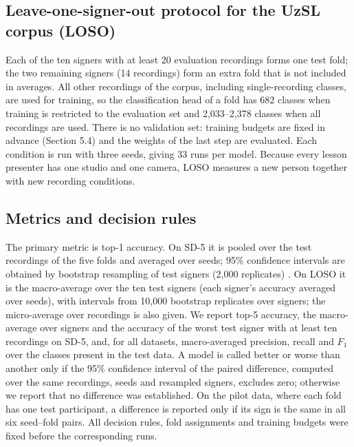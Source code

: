 \documentclass[a4paper,fleqn]{cas-dc}
\begin{document}
\hypertarget{leave-one-signer-out-protocol-for-the-uzsl-corpus-loso}{%
\subsection{Leave-one-signer-out protocol for the UzSL corpus (LOSO)}\label{leave-one-signer-out-protocol-for-the-uzsl-corpus-loso}}

Each of the ten signers with at least 20 evaluation recordings forms one test fold; the two remaining signers (14 recordings) form an extra fold that is not included in averages. All other recordings of the corpus, including single-recording classes, are used for training, so the classification head of a fold has 682 classes when training is restricted to the evaluation set and 2,033--2,378 classes when all recordings are used. There is no validation set: training budgets are fixed in advance (Section 5.4) and the weights of the last step are evaluated. Each condition is run with three seeds, giving 33 runs per model. Because every lesson presenter has one studio and one camera, LOSO measures a new person together with new recording conditions.

\hypertarget{metrics-and-decision-rules}{%
\subsection{Metrics and decision rules}\label{metrics-and-decision-rules}}

The primary metric is top-1 accuracy. On SD-5 it is pooled over the test recordings of the five folds and averaged over seeds; 95\% confidence intervals are obtained by bootstrap resampling of test signers (2,000 replicates) \cite{2016_efron_hastie_casi}. On LOSO it is the macro-average over the ten test signers (each signer's accuracy averaged over seeds), with intervals from 10,000 bootstrap replicates over signers; the micro-average over recordings is also given. We report top-5 accuracy, the macro-average over signers and the accuracy of the worst test signer with at least ten recordings on SD-5, and, for all datasets, macro-averaged precision, recall and \(F_1\) over the classes present in the test data. A model is called better or worse than another only if the 95\% confidence interval of the paired difference, computed over the same recordings, seeds and resampled signers, excludes zero; otherwise we report that no difference was established. On the pilot data, where each fold has one test participant, a difference is reported only if its sign is the same in all six seed--fold pairs. All decision rules, fold assignments and training budgets were fixed before the corresponding runs.
\end{document}
